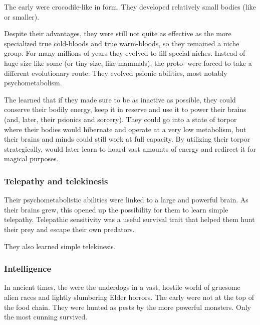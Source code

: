
The early \ophidians{} were crocodile-like in form. 
They developed relatively small bodies (like \humans or smaller). 

Despite their advantages, they were still not quite as effective as the more specialized true cold-bloods and true warm-bloods, so they remained a niche group. 
For many millions of years they evolved to fill special niches. 
Instead of huge size like some \saurians{} (or tiny size, like mammals), the proto-\ophidians{} were forced to take a different evolutionary route: 
They evolved psionic abilities, most notably psychometabolism. 

The \ophidians{} learned that if they made sure to be as inactive as possible, they could conserve their bodily energy, keep it in reserve and use it to power their brains (and, later, their psionics and sorcery). 
They could go into a state of torpor where their bodies would hibernate and operate at a very low metabolism, but their brains and minds could still work at full capacity. 
By utilizing their torpor strategically,  would later learn to hoard vast amounts of energy and redirect it for magical purposes. 





\subsubsection{Telepathy and telekinesis}
Their psychometabolistic abilities were linked to a large and powerful brain. 
As their brains grew, this opened up the possibility for them to learn simple telepathy. 
Telepathic sensitivity was a useful survival trait that helped them hunt their prey and escape their own predators. 

They also learned simple telekinesis. 





\subsubsection{Intelligence}
In ancient times, the \ophidians were the underdogs in a vast, hostile world of gruesome alien races and lightly slumbering Elder horrors.
The early \ophidians were not at the top of the food chain. 
They were hunted as pests by the more powerful monsters. 
Only the most cunning \ophidians survived. 


